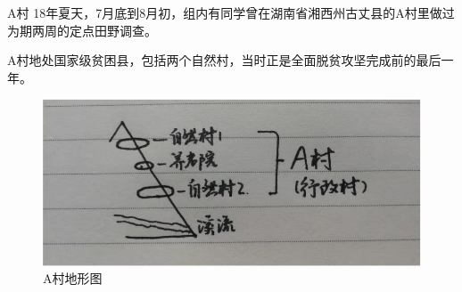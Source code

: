 \documentclass[presentation]{beamer}
\begin{document}
\begin{frame}[label={sec:org1d9d777}]{A村}
18年夏天，7月底到8月初，组内有同学曾在湖南省湘西州古丈县的A村里做过为期两周的定点田野调查。

A村地处国家级贫困县，包括两个自然村，当时正是全面脱贫攻坚完成前的最后一年。

\begin{figure}
\centering
\includegraphics[width=.7\textwidth]{4}
\caption*{A村地形图}
\end{figure}
\end{frame}
\end{document}

